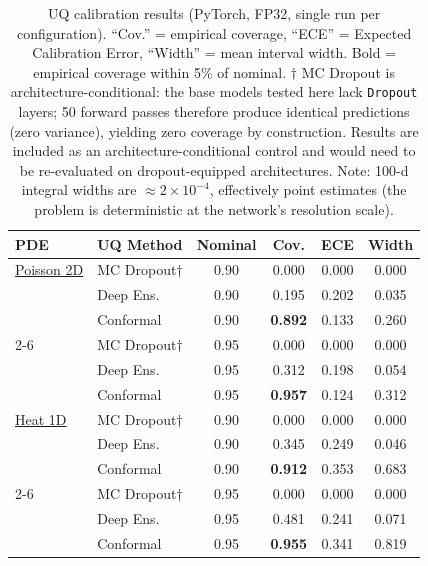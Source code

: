 \documentclass[12pt,a4paper]{article}
\theoremstyle{plain}
\begin{document}
\begin{table}[ht]
    \centering
    \caption{UQ calibration results (PyTorch, FP32, single run per configuration).
        ``Cov.'' = empirical coverage, ``ECE'' = Expected Calibration Error,
        ``Width'' = mean interval width.
        Bold = empirical coverage within 5\% of nominal.
        $\dagger$ MC Dropout is architecture-conditional: the base models
        tested here lack \texttt{Dropout} layers; 50 forward passes therefore
        produce identical predictions (zero variance), yielding zero coverage
        by construction.  Results are included as an architecture-conditional
        control and would need to be re-evaluated on dropout-equipped architectures.
        Note: 100-d integral widths are $\approx 2\times10^{-4}$,
        effectively point estimates (the problem is deterministic at the
    network's resolution scale).}
    \begin{tabular}{llcccc}
        \toprule
        \textbf{PDE} & \textbf{UQ Method} &
        \textbf{Nominal} & \textbf{Cov.} & \textbf{ECE} & \textbf{Width} \\
        \midrule
        \underline{Poisson 2D}
        & MC Dropout$\dagger$    & 0.90 & 0.000 & 0.000 & 0.000 \\
        & Deep Ens.              & 0.90 & 0.195 & 0.202 & 0.035 \\
        & Conformal              & 0.90 & \textbf{0.892} & 0.133 & 0.260 \\
        \cline{2-6}
        & MC Dropout$\dagger$    & 0.95 & 0.000 & 0.000 & 0.000 \\
        & Deep Ens.              & 0.95 & 0.312 & 0.198 & 0.054 \\
        & Conformal              & 0.95 & \textbf{0.957} & 0.124 & 0.312 \\
        \midrule
        \underline{Heat 1D}
        & MC Dropout$\dagger$    & 0.90 & 0.000 & 0.000 & 0.000 \\
        & Deep Ens.              & 0.90 & 0.345 & 0.249 & 0.046 \\
        & Conformal              & 0.90 & \textbf{0.912} & 0.353 & 0.683 \\
        \cline{2-6}
        & MC Dropout$\dagger$    & 0.95 & 0.000 & 0.000 & 0.000 \\
        & Deep Ens.              & 0.95 & 0.481 & 0.241 & 0.071 \\
        & Conformal              & 0.95 & \textbf{0.955} & 0.341 & 0.819 \\
        \midrule

\end{tabular}
\end{table}
\end{document}
